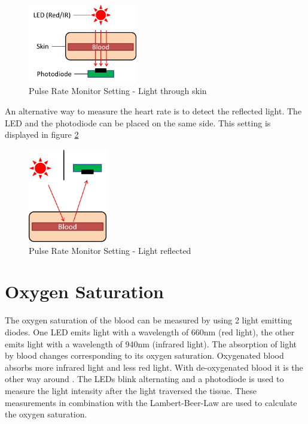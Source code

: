\documentclass[oneside, notitlepage]{scrreprt}
\begin{document}
\begin{figure}[H]
	\centering
	\includegraphics[width=180px]{images/pulse-rate-aufbau.png}
	\caption{Pulse Rate Monitor Setting - Light through skin}
	\label{fig:pulse-rate-monitor-setting}
\end{figure}

An alternative way to measure the heart rate is to detect the reflected light. The LED and the photodiode can be placed on the same side. This setting is displayed in figure \ref{fig:pulse-rate-monitor-setting2}

\begin{figure}[H]
	\centering
	\includegraphics[width=130px]{images/pulse-rate-aufbau2.png}
	\caption{Pulse Rate Monitor Setting - Light reflected}
	\label{fig:pulse-rate-monitor-setting2}
\end{figure}

\section{Oxygen Saturation}
\label{sec:oxygen-saturation}
The oxygen saturation of the blood can be measured by using 2 light emitting diodes. One LED emits light with a wavelength of 660nm (red light), the other emits light with a wavelength of 940nm (infrared light). The absorption of light by blood changes corresponding to its oxygen saturation. Oxygenated blood absorbs more infrared light and less red light. With de-oxygenated blood it is the other way around \cite{bib:pulse-oximetry}. The LEDs blink alternating and a photodiode is used to measure the light intensity after the light traversed the tissue. These measurements in combination with the Lambert-Beer-Law are used to calculate the oxygen saturation.
\end{document}
